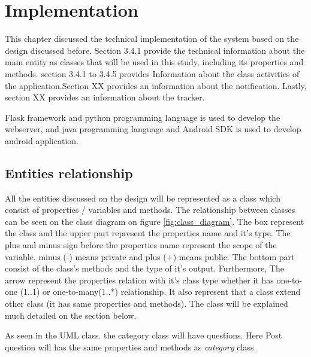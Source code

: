 


\chapter{Implementation}
This chapter discussed the technical implementation of the system based on the design discussed before. Section 3.4.1 provide the technical information about the main entity as classes that will be used in this study, including its properties and methods.
section 3.4.1 to 3.4.5 provides Information about the class activities of the application.Section XX provides an information about the notification. Lastly, section XX provides an information about the tracker.


Flask framework and python programming language is used to develop the webserver, and java programming language and Android SDK is used to develop android application.





\section{Entities relationship}
All the entities discussed on the design will be represented as a class which consist of properties / variables and methods. The relationship between classes can be seen on the class diagram on figure \ref{fig:class_diagram}. The box represent the class and the upper part represent the properties name and it's type. The plus and minus sign before the properties name represent the scope of the variable, minus (-) means private and plus (+) means public. The bottom part consist of the class's methods and the type of it's output. Furthermore, The arrow represent the properties relation with it's class type whether it has one-to-one (1..1)  or one-to-many(1..*) relationship. It also represent that a class extend  other class (it has same properties and methods). The class will be explained much detailed on the section below.


As seen in the UML class.
the category class will have questions.
Here Post question will has the same properties and methods as \textit{category} class.


